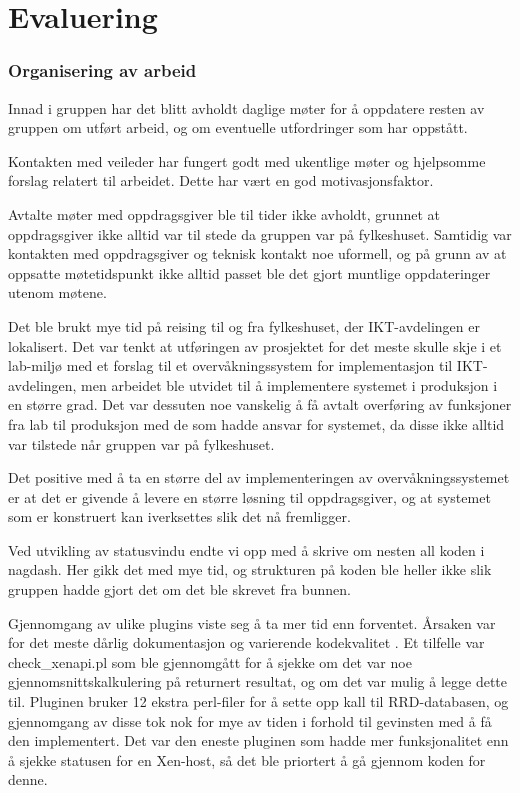 \section{Evaluering}
\subsubsection{Organisering av arbeid}

Innad i gruppen har det blitt avholdt daglige møter for å oppdatere resten av gruppen om utført arbeid, og om eventuelle utfordringer som har oppstått. 

Kontakten med veileder har fungert godt med ukentlige møter og hjelpsomme forslag relatert til arbeidet. Dette har vært en god motivasjonsfaktor.

Avtalte møter med oppdragsgiver ble til tider ikke avholdt, grunnet at oppdragsgiver ikke alltid var til stede da gruppen var på fylkeshuset. Samtidig var kontakten med oppdragsgiver og teknisk kontakt noe uformell, og på grunn av at oppsatte møtetidspunkt ikke alltid passet ble det gjort muntlige oppdateringer utenom møtene.

Det ble brukt mye tid på reising til og fra fylkeshuset, der IKT-avdelingen er lokalisert. Det var tenkt at utføringen av prosjektet for det meste skulle skje i et lab-miljø med et forslag til et overvåkningssystem for implementasjon til IKT-avdelingen, men arbeidet ble utvidet til å implementere systemet i produksjon i en større grad. Det var dessuten noe vanskelig å få avtalt overføring av funksjoner fra lab til produksjon med de som hadde ansvar for systemet, da disse ikke alltid var tilstede når gruppen var på fylkeshuset. 

Det positive med å ta en større del av implementeringen av overvåkningssystemet er at det er givende å levere en større løsning til oppdragsgiver, og at systemet som er konstruert kan iverksettes slik det nå fremligger.

Ved utvikling av statusvindu endte vi opp med å skrive om nesten all koden i nagdash. Her gikk det med mye tid, og strukturen på koden ble heller ikke slik gruppen hadde gjort det om det ble skrevet fra bunnen. 

Gjennomgang av ulike plugins viste seg å ta mer tid enn forventet. Årsaken var for det meste dårlig dokumentasjon og varierende kodekvalitet . Et tilfelle var check\_xenapi.pl som ble gjennomgått for å sjekke om det var noe gjennomsnittskalkulering på returnert resultat, og om det var mulig å legge dette til. Pluginen bruker 12 ekstra perl-filer for å sette opp kall til RRD-databasen, og gjennomgang av disse tok nok for mye av tiden i forhold til gevinsten med å få den implementert. Det var den eneste pluginen som hadde mer funksjonalitet enn å sjekke statusen for en Xen-host, så det ble priortert å gå gjennom koden for denne. 

